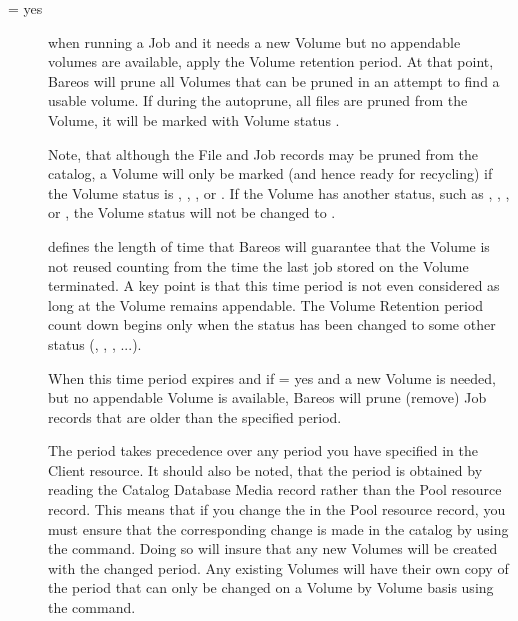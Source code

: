 \begin{description}

\item[ = yes]
   when running a Job  and it needs a new Volume but no appendable volumes are available, apply the Volume retention period.
   At that point,
   Bareos will prune all Volumes that can be pruned in an
   attempt to find a usable volume. If  during the autoprune, all files are
   pruned from the Volume, it will be marked with Volume status .

   Note, that although the File and Job records may be
   pruned from the catalog, a Volume will only be marked  (and hence
   ready for recycling) if the Volume status is , , , or .
   If the Volume has another status, such as , , ,
    or , the Volume status will not be changed to .

\item[]
   defines the length of time that Bareos will
   guarantee that the Volume is not reused counting from the time the last
   job stored on the Volume terminated.  A key point is that this time
   period is not even considered as long at the Volume remains appendable.
   The Volume Retention period count down begins only when the 
   status has been changed to some other status (, , , ...).

   When this time period expires and if  = yes
   and a new Volume is needed, but no appendable Volume is available,
   Bareos will prune (remove) Job records that are older than the specified
    period.

   The  period takes precedence over any 
   period you have specified in the Client resource.  It should also be
   noted, that the  period is obtained by reading the
   Catalog Database Media record rather than the Pool resource record.
   This means that if you change the  in the Pool resource
   record, you must ensure that the corresponding change is made in the
   catalog by using the  command.  Doing so will insure
   that any new Volumes will be created with the changed 
   period.  Any existing Volumes will have their own copy of the 
   period that can only be changed on a Volume by Volume basis
   using the  command.


\end{description}
